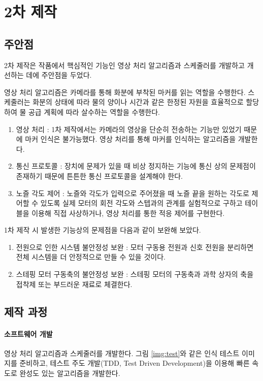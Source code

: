 \documentclass[chapter,11pt,oneside,openany]{xoblivoir}
\begin{document}
\section{2차 제작}

\subsection{주안점}
2차 제작은 작품에서 핵심적인 기능인 영상 처리 알고리즘과 스케줄러를 개발하고 개선하는 데에 주안점을 두었다.

영상 처리 알고리즘은 카메라를 통해 화분에 부착된 마커를 읽는 역할을 수행한다.
스케줄러는 화분의 상태에 따라 물의 양이나 시간과 같은 한정된 자원을 효율적으로
할당하여 물 공급 계획에 따라 살수하는 역할을 수행한다.

\begin{enumerate}
\item 영상 처리 : 1차 제작에서는 카메라의 영상을 단순히 전송하는 기능만 있었기 때문에
마커 인식은 불가능했다. 영상 처리를 통해 마커를 인식하는 알고리즘을 개발한다.
\item 통신 프로토콜 : 장치에 문제가 있을 때 비상 정지하는 기능에 통신 상의
문제점이 존재하기 때문에 튼튼한 통신 프로토콜을 설계해야 한다.
\item 노즐 각도 제어 : 노즐와 각도가 입력으로 주어졌을 때 노즐 끝을 원하는 각도로 제어할 수 있도록
실제 모터의 회전 각도와 스텝과의 관계를 실험적으로 구하고 테이블을 이용해 직접 사상하거나,
영상 처리를 통한 적응 제어를 구현한다.
\end{enumerate}

1차 제작 시 발생한 기능상의 문제점을 다음과 같이 보완해 보았다.

\begin{enumerate}
\item 전원으로 인한 시스템 불안정성 보완 : 모터 구동용 전원과 신호 전원을 분리하면 전체 시스템을 더 안정적으로 만들 수 있을 것이다.
\item 스테핑 모터 구동축의 불안정성 보완 : 스테핑 모터의 구동축과 과학 상자의 축을 접착제 또는 부드러운 재료로 체결한다.
\end{enumerate}

\clearpage

\subsection{제작 과정}

\paragraph{소프트웨어 개발}
영상 처리 알고리즘과 스케줄러를 개발한다.
그림 \ref{img:test}와 같은 인식 테스트 이미지를 준비하고,
테스트 주도 개발(TDD, Test Driven Development)을 이용해
빠른 속도로 완성도 있는 알고리즘을 개발한다.
\end{document}
